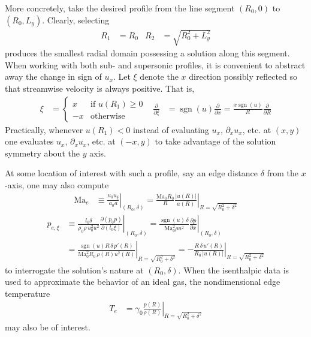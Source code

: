 \documentclass[letterpaper,11pt,nointlimits,reqno]{amsart}
\newcommand{\Mach}[1][]{\mbox{Ma}_{#1}}
\begin{document}
More concretely, take the desired profile from the line segment
$\left(R_0,0\right)$ to $\left(R_0,L_y\right)$.  Clearly, selecting
\begin{align}
  R_1 &= R_0
&
  R_2 &= \sqrt{R_0^2 + L_y^2}
\end{align}
produces the smallest radial domain possessing a solution along this segment.
When working with both sub- and supersonic profiles, it is convenient to
abstract away the change in sign of $u_x$.  Let $\xi$ denote the $x$ direction
possibly reflected so that streamwise velocity is always positive.  That is,
\begin{align}
  \xi &= \begin{cases}  x &\mbox{if } u\!\left(R_1\right) \geq 0 \\
                       -x &\mbox{otherwise}
  \end{cases}
&
    \frac{\partial}{\partial\xi}
 &= \operatorname{sgn}(u) \frac{\partial}{\partial{}x}
  = \frac{x \operatorname{sgn}(u)}{R} \frac{\partial}{\partial{}R}
\end{align}
Practically, whenever $u\left(R_1\right) < 0$ instead of evaluating $u_x$,
$\partial_x u_x$, etc. at $\left(x,y\right)$ one evaluates $u_x$, $\partial_x
u_x$, etc. at $\left(-x,y\right)$ to take advantage of the solution symmetry
about the $y$ axis.

At some location of interest with such a profile, say an edge distance
$\delta$ from the $x$-axis, one may also compute
\begin{align}
  \Mach[e]{}
  &\equiv
  \left. \frac{u_0 u_\xi}{a_0 a} \right|_{\left(R_0,\delta\right)}
  =
  \left.
    \frac{\Mach[0]{} R_0}{R}
    \frac{\left|u\!\left(R\right)\right|}
         {      a\!\left(R\right)       }
  \right|_{R = \sqrt{R_0^2 + \delta^2}}
\end{align}
\begin{align}
  p_{e,\xi}
  &\equiv
  \left.
  \frac{l_0 \delta}{\rho_0 \rho \, u_0^2 u^2}
    \frac{\partial\left(p_0 p\right)}{\partial\left(l_0 \xi\right)}
  \right|_{\left(R_0,\delta\right)}
  =
  \left.
    \frac{\operatorname{sgn}(u) \, \delta}{\Mach[0]^2 \rho u^2}
      \frac{\partial{}p}{\partial{}x}
  \right|_{\left(R_0,\delta\right)}
\\&=
  \left.
    \frac{\operatorname{sgn}(u) R \, \delta \, p'\!\left(R\right)}
         {\Mach[0]^2 R_0 \, \rho\!\left(R\right) u^2\!\left(R\right)}
  \right|_{R=\sqrt{R_0^2 + \delta^2}}
  =
  - \left.
      \frac{R \, \delta \, u'\!\left(R\right)}
           {R_0 \, \left|u\!\left(R\right)\right|}
  \right|_{R=\sqrt{R_0^2 + \delta^2}}
\end{align}
to interrogate the solution's nature at $\left(R_0, \delta\right)$. When the
isenthalpic data is used to approximate the behavior of an ideal gas, the
nondimensional edge temperature
\begin{align}
    T_e &= \left.
        \gamma_0 \frac{p\!\left(R\right)}{\rho\!\left(R\right)}
  \right|_{R=\sqrt{R_0^2 + \delta^2}}
\end{align}
may also be of interest.
\end{document}
